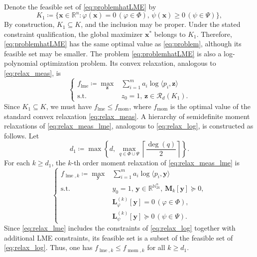 \documentclass[pdflatex,sn-mathphys-num]{sn-jnl}%
\newcommand{\re}{\mathbb{R}}
\newcommand{\rd}[1]{{\color{red}#1}}
\newcommand{\vect}[1]{\boldsymbol{#1}}
\newcommand{\mat}[1]{\boldsymbol{#1}}
\newcommand{\st}{\mathrm{s.t.}}
\theoremstyle{thmstyleone}%
\theoremstyle{thmstyletwo}%
\theoremstyle{thmstylethree}%
\begin{document}
\rd{Denote the feasible set of \eqref{eq:problemhatLME} by}
\[
K_1 \coloneqq \{\vect{x}\in\re^n: \varphi(\vect{x})=0\,(\varphi\in \Phi),\, 
\psi(\vect{x})\ge 0\,(\psi\in \Psi)\},
\]
\rd{By construction, $K_1\subseteq K$, and the inclusion may be proper.
Under the stated constraint qualification, the global maximizer
$\vect{x}^*$ belongs to $K_1$. Therefore,
\eqref{eq:problemhatLME} has the same optimal value as
\eqref{eq:problem}, although its feasible set may be smaller.}
The problem \eqref{eq:problemhatLME} is also 
a log-polynomial optimization problem.
\rd{Its convex relaxation, analogous to \eqref{eq:relax_meas}, is}
\begin{equation}  \label{eq:relax_meas_lme}
	\left\{\begin{array}{rl}
		f_{\operatorname{lme}} \coloneqq \max\limits_{\vect{z}} 
		&  \sum\limits_{i=1}^m a_i \log \langle p_i,\vect{z}\rangle   \\
		\st & z_0 = 1,\, \vect{z}  \in  \mathscr{R}_d(K_1) .
	\end{array}\right.
\end{equation}
Since $K_1\subseteq K$, we must have 
$f_{\operatorname{lme}} \le f_{\operatorname{mom}}$,
where $f_{\operatorname{mom}}$ is the optimal value of the 
standard convex relaxation \eqref{eq:relax_meas}.
\rd{A hierarchy of semidefinite moment relaxations of
\eqref{eq:relax_meas_lme}, analogous to \eqref{eq:relax_log}, is
constructed as follows. Let}
\[
d_1
\coloneqq
\max\left\{
d,\,
\max_{q\in\Phi\cup\Psi}
\left\lceil\frac{\deg(q)}{2}\right\rceil
\right\}.
\]
\rd{For each $k\geq d_1$, the $k$-th order moment relaxation of
\eqref{eq:relax_meas_lme} is}
\begin{equation}\label{eq:relax_lme}
	\left\{\begin{array}{rl}
		f_{\operatorname{lme},k} \coloneqq \max\limits_{\vect{y}} 
		& \sum\limits_{i=1}^m a_i \log \langle p_i, \vect{y} \rangle \\
		\st 
		& y_0 = 1,\, \vect{y} \in \mathbb{R}^{\mathbb{N}_{2k}^n},\, 
		\mat{M}_k [\vect{y}] \succeq 0,\\
		& \mat{L}_{\varphi}^{(k)}[\vect{y}] = 0\,(\varphi\in\Phi),\\ 
		& \mat{L}_{\psi}^{(k)}[\vect{y}] \succeq 0 \,(\psi  \in \Psi).
	\end{array}\right.
\end{equation}
Since \eqref{eq:relax_lme} includes the constraints of
\eqref{eq:relax_log} together with additional LME constraints, its
feasible set is a subset of the feasible set of
\eqref{eq:relax_log}.
Thus, one has $f_{\operatorname{lme},k}\le f_{\operatorname{mom},k}$ 
for all $k\ge d_1$.
\end{document}
